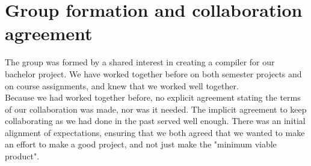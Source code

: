 \section{Group formation and collaboration agreement}

The group was formed by a shared interest in creating a compiler for our bachelor
project. We have worked together before on both semester projects and on course
assignments, and knew that we worked well together.\\ Because we had worked together
before, no explicit agreement stating the terms of our collaboration was made, nor
was it needed. The implicit agreement to keep collaborating as we had done in the
past served well enough. There was an initial alignment of expectations, ensuring
that we both agreed that we wanted to make an effort to make a good project, and not
just make the "minimum viable product". 
  
